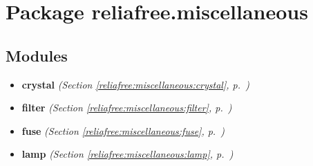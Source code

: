 %
%
%


\section{Package reliafree.miscellaneous}

    \label{reliafree:miscellaneous}


\subsection{Modules}

\begin{itemize}
\setlength{\parskip}{0ex}
\item \textbf{crystal}
  \textit{(Section \ref{reliafree:miscellaneous:crystal}, p.~\pageref{reliafree:miscellaneous:crystal})}

\item \textbf{filter}
  \textit{(Section \ref{reliafree:miscellaneous:filter}, p.~\pageref{reliafree:miscellaneous:filter})}

\item \textbf{fuse}
  \textit{(Section \ref{reliafree:miscellaneous:fuse}, p.~\pageref{reliafree:miscellaneous:fuse})}

\item \textbf{lamp}
  \textit{(Section \ref{reliafree:miscellaneous:lamp}, p.~\pageref{reliafree:miscellaneous:lamp})}

\end{itemize}



